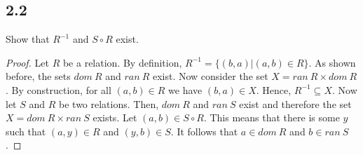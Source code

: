 \subsection*{2.2} Show that $R^{-1}$ and $S \circ R$ exist.

\begin{proof}
Let $R$ be a relation. By definition, $R^{-1} = \{(b,a) | (a,b) \in R\}$. As shown before, the sets $dom~R$ and $ran~R$ exist. Now consider the set $X = ran~R \times dom~R$. By construction, for all $(a,b) \in R$ we have $(b,a) \in X$. Hence, $R^{-1} \subseteq X$.
\vspace{1em}
Now let $S$ and $R$ be two relations. Then, $dom~R$ and $ran~S$ exist and therefore the set $X = dom~R \times ran~S$ exists. Let $(a,b) \in S \circ R$. This means that there is some $y$ such that $(a,y) \in R$ and $(y,b) \in S$. It follows that $a \in dom~R$ and $b \in ran~S$. 
\end{proof}

